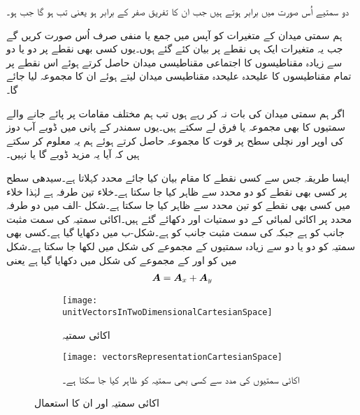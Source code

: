 دو سمتیے اُس صورت میں برابر ہوتے ہیں جب ان کا تفریق صفر کے برابر ہو یعنی  تب ہو گا جب  ہو۔

ہم سمتی میدان کے متغیرات کو آپس میں جمع یا منفی صرف اُس صورت کریں گے جب یہ متغیرات ایک ہی نقطے پر بیان کئے گئے ہوں۔یوں کسی بھی نقطے پر دو یا دو سے زیادہ مقناطیسوں کا اجتماعی مقناطیسی میدان حاصل کرتے ہوئے اس نقطے پر تمام مقناطیسوں کا علیحدہ علیحدہ مقناطیسی میدان لیتے ہوئے ان کا مجموعہ لیا جائے گا۔

اگر ہم سمتی میدان کی بات نہ کر رہے ہوں تب ہم مختلف مقامات پر پائے جانے والے سمتیوں کا بھی مجموعہ یا فرق لے سکتے ہیں۔یوں سمندر کے پانی میں ڈوبے  آب دوز کی اوپر اور نچلی سطح پر قوت کا مجموعہ حاصل کرتے ہوئے ہم یہ معلوم کر سکتے ہیں کہ آیا یہ مزید ڈوبے گا یا نہیں۔

ایسا طریقہ جس سے کسی نقطے کا مقام بیان کیا جائے محدد کہلاتا ہے۔سیدھی سطح پر کسی بھی نقطے کو دو محدد سے ظاہر کیا جا سکتا ہے۔خلاء تین طرفہ ہے لہٰذا خلاء میں کسی بھی نقطے کو تین محدد سے ظاہر کیا جا سکتا ہے۔شکل -الف میں دو طرفہ   محدد پر اکائی لمبائی کے دو سمتیات  اور  دکھائے گئے ہیں۔اکائی سمتیہ  کی سمت مثبت  جانب کو ہے جبکہ   کی سمت مثبت  جانب کو ہے۔شکل-ب میں  دکھایا گیا ہے۔کسی بھی سمتیہ کو دو یا دو سے زیادہ سمتیوں کے مجموعے کی شکل میں لکھا جا سکتا ہے۔شکل میں  کو  اور  کے مجموعے کی شکل میں دکھایا گیا ہے یعنی
\begin{align}
{\ensuremath{{\boldsymbol{A}}}}={{\boldsymbol{A}}}_x+{{\boldsymbol{A}}}_y
\end{align}

\begin{figure}
\begin{subfigure}{0.5\textwidth}
\centering
\texttt{[image: unitVectorsInTwoDimensionalCartesianSpace]}
\caption{اکائی سمتیہ}
\end{subfigure}
%
\begin{subfigure}{0.5\textwidth}
\centering
\texttt{[image: vectorsRepresentationCartesianSpace]}
\caption{اکائی سمتیوں کی مدد سے کسی بھی سمتیہ کو ظاہر کیا جا سکتا ہے۔}
\end{subfigure}
\caption{اکائی سمتیہ اور ان کا استعمال}
\label{شکل_سمتیہ_اکائی_سے_سمتیہ_کا_اظہار}
\end{figure}
%


